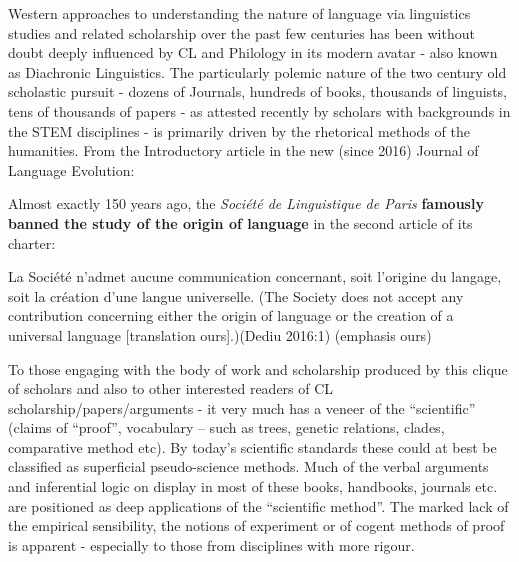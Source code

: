 \vskip 6pt

Western approaches to understanding the nature of language via linguistics studies and related scholarship over the past few centuries has been without doubt deeply influenced by CL and Philology in its modern avatar - also known as Diachronic Linguistics. The particularly polemic nature of the two century old scholastic pursuit - dozens of Journals, hundreds of books, thousands of linguists, tens of thousands of papers - as attested recently by scholars with backgrounds in the STEM disciplines - is primarily driven by the rhetorical methods of the humanities. From the Introductory article in the new (since 2016) Journal of Language Evolution:

\vskip 6pt

\begin{myquote}
Almost exactly 150 years ago, the \textit{Société de Linguistique de Paris} \textbf{famously banned the study of the origin of language} in the second article of its charter:
\end{myquote}

\vskip 2pt

\begin{myquote}
La Société n’admet aucune communication concernant, soit l’origine du langage, soit la création d’une langue universelle. (The Society does not accept any contribution concerning either the origin of language or the creation of a universal language [translation ours].)(Dediu 2016:1) (emphasis ours)
\end{myquote}

\vskip 3pt

To those engaging with the body of work and scholarship produced by this clique of scholars and also to other interested readers of CL scholarship/papers/arguments - it very much has a veneer of the “scientific” (claims of “proof”, vocabulary – such as trees, genetic relations, clades, comparative method etc). By today’s scientific standards these could at best be classified as superficial pseudo-science methods. Much of the verbal arguments and inferential logic on display in most of these books, handbooks, journals etc. are positioned as deep applications of the “scientific method”. The marked lack of the empirical sensibility, the notions of experiment or of cogent methods of proof is apparent - especially to those from disciplines with more rigour.

